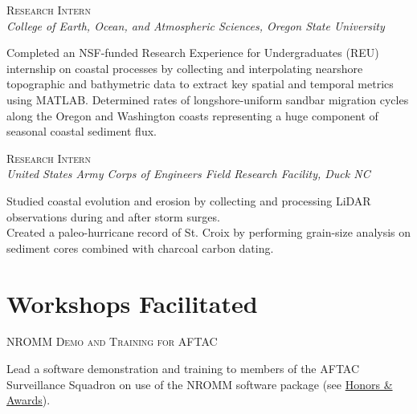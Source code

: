 \documentclass[11pt, letterpaper]{article}
\newcommand{\years}[1]{\marginnote{\scriptsize #1}}
\begin{document}
\years{2013}\textsc{Research Intern}\\
\textit{College of Earth, Ocean, and Atmospheric Sciences, Oregon State University}
\begin{adjustwidth}{5pt}{0pt}
	Completed an NSF-funded Research Experience for Undergraduates (REU)
	internship on coastal processes by collecting and interpolating nearshore
	topographic and bathymetric data to extract key spatial and temporal
	metrics using MATLAB. Determined rates of longshore-uniform sandbar
	migration cycles along the Oregon and Washington coasts representing a huge
	component of seasonal coastal sediment flux.
\end{adjustwidth}

\years{2013}\textsc{Research Intern}\\
\textit{United States Army Corps of Engineers Field Research Facility, Duck NC}
\begin{adjustwidth}{5pt}{0pt}
	Studied coastal evolution and erosion by collecting and processing LiDAR
	observations during and after storm surges.\\
	Created a paleo-hurricane record of St. Croix by performing grain-size
	analysis on sediment cores combined with charcoal carbon dating.
\end{adjustwidth}

\section*{Workshops Facilitated}
\label{sec:workshops}
\noindent
\years{2021}\textsc{NROMM Demo and Training for AFTAC}%
\begin{adjustwidth}{5pt}{0pt}
    Lead a software demonstration and training to members of the AFTAC 
     Surveillance Squadron on use of the
    NROMM software package (see \hyperref[sec:awards]{Honors \& Awards}). 
\end{adjustwidth}

\end{document}
